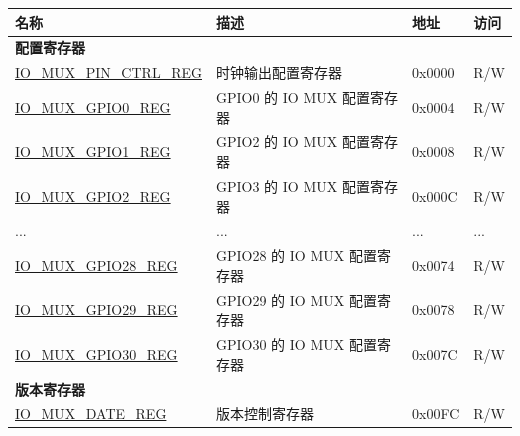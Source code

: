 \begin{longtable}{ | p{6cm} | p{7.6cm} | p{1.3cm} | p{1cm} | }
\hline\rowcolor{lightgray}
\textbf{名称} & \textbf{描述} & \textbf{地址} & \textbf{访问} \\ \hline
\endhead
\multicolumn{4}{|l|}{\textbf{配置寄存器}} \\ \hline
\hyperref[regdesc:IOMUXPINCTRLREG]{IO\_MUX\_PIN\_CTRL\_REG} & 时钟输出配置寄存器 & 0x0000 & R/W \\ \hline
\hyperref[regdesc:IOMUXGPIONREG]{IO\_MUX\_GPIO0\_REG} & GPIO0 的 IO MUX 配置寄存器 & 0x0004 & R/W \\ \hline
\hyperref[regdesc:IOMUXGPIONREG]{IO\_MUX\_GPIO1\_REG} & GPIO2 的 IO MUX 配置寄存器 & 0x0008 & R/W \\ \hline
\hyperref[regdesc:IOMUXGPIONREG]{IO\_MUX\_GPIO2\_REG} & GPIO3 的 IO MUX 配置寄存器 & 0x000C & R/W \\ \hline
...& ... & ... & ... \\ \hline
\hyperref[regdesc:IOMUXGPIONREG]{IO\_MUX\_GPIO28\_REG} & GPIO28 的 IO MUX 配置寄存器 & 0x0074 & R/W \\ \hline
\hyperref[regdesc:IOMUXGPIONREG]{IO\_MUX\_GPIO29\_REG} & GPIO29 的 IO MUX 配置寄存器 & 0x0078 & R/W \\ \hline
\hyperref[regdesc:IOMUXGPIONREG]{IO\_MUX\_GPIO30\_REG} & GPIO30 的 IO MUX 配置寄存器 & 0x007C & R/W \\ \hline
\multicolumn{4}{|l|}{\textbf{版本寄存器}} \\ \hline
\hyperref[regdesc:IOMUXDATEREG]{IO\_MUX\_DATE\_REG} & 版本控制寄存器 & 0x00FC & R/W \\ \hline
\end{longtable}
